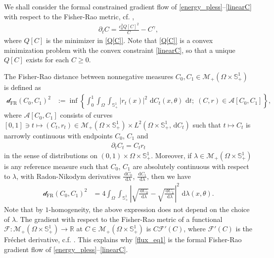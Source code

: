 \documentclass{article}
\numberwithin{equation}{section}
\newcommand{\R}{\mathbb{R}}
\def\[{\begin{eqnarray*}}
\def\]{\end{eqnarray*}}
\def\d{\,\mathrm{d}}
\begin{document}
We shall consider the formal constrained gradient flow of \eqref{energy_pless}--\eqref{linearC}
with respect to the Fisher-Rao metric, cf. \cite{gallouet2017jko,chizat2016interpolating},
\begin{align}\label{flux_eq1}
   \partial_t C = \frac{c_0^2 Q[C]^2}{C}-C^\gamma,
\end{align}
where $Q[C]$ is the minimizer in \eqref{Q[C]}. Note that \eqref{Q[C]} is a convex minimization problem
with the convex constraint \eqref{linearC}, so that a unique $Q[C]$ exists for each $C\geq 0$.

The Fisher-Rao distance between nonnegative measures $C_0, C_1\in \mathcal{M}_+(\Omega\times\mathbb{S}^1_+)$ is defined as
\begin{align}\label{dist1}
   \mathcal{d}_\mathrm{FR}(C_0,C_1)^2 &:= \inf \left\{ \int_0^1 \int_\Omega\int_{\mathbb{S}^1_+} |r_t(x)|^2 \,\d C_t(x,\theta) \,\d t; \;
     {(C,r)\in \mathcal{A}[C_0,C_1]} \right\},
\end{align}
where $\mathcal{A}[C_0,C_1]$ consists of curves $[0,1]\ni t\mapsto (C_t,r_t)\in \mathcal{M}_+(\Omega\times \mathbb{S}_+^1)\times L^2(\Omega\times \mathbb{S}_+^1, \d C_t)$
such that $t\mapsto C_t$ is narrowly continuous with endpoints $C_0$, $C_1$ and
\[
   \partial_t C_t =C_t r_t
\]
in the sense of distributions on $(0,1)\times \Omega\times \mathbb{S}_+^1$.
Moreover, if $\lambda\in \mathcal{M}_+(\Omega\times\mathbb{S}^1_+)$ is any reference measure such that $C_0$, $C_1$ are absolutely continuous with respect to $\lambda$,
with Radon-Nikodym derivatives $\frac{\d C_0}{\d\lambda}$, $\frac{\d C_1}{\d\lambda}$, then we have
\begin{align}\label{dist2}
   \mathcal{d}_\mathrm{FR}(C_0,C_1)^2  &= 4 \int_\Omega \int_{\mathbb{S}_+^1} \left|\sqrt{\frac{\d C_0}{\d\lambda}}-\sqrt{\frac{\d C_1}{\d\lambda}}\right|^2\, \d\lambda(x,\theta).
\end{align}
Note that by $1$-homogeneity, the above expression does not depend on the choice of $\lambda$.
The gradient with respect to the Fisher-Rao metric of a functional $\mathcal{F}: \mathcal{M}_+(\Omega\times\mathbb{S}^1_+) \to \R$ at $C\in\mathcal{M}_+(\Omega\times\mathbb{S}^1_+)$
is $C \mathcal{F}'(C)$, where $\mathcal{F}'(C)$ is the Fr\'{e}chet derivative, c.f. \cite{gallouet2017jko}. This explains why \eqref{flux_eq1} is the formal Fisher-Rao
gradient flow of \eqref{energy_pless}--\eqref{linearC}.
\end{document}
